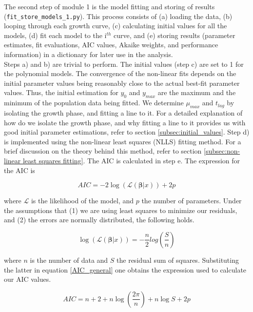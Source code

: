 \documentclass[titlepage,11pt]{article}
\begin{document}
\begin{linenumbers}
			The second step of module 1 is the model fitting and storing of results (\verb|fit_store_models_1.py|). This process consists of (a) loading the data, (b) looping through each growth curve, (c) calculating initial values for all the models, (d) fit each model to the i$ ^{th} $ curve, and (e) storing results (parameter estimates, fit evaluations, AIC values, Akaike weights, and performance information) in a dictionary for later use in the analysis. \\
			Steps a) and b) are trivial to perform. The initial values (step c) are set to 1 for the polynomial models. The convergence of the non-linear fits depends on the initial parameter values being reasonably close to the actual best-fit parameter values. Thus, the initial estimation for $ y_{0} $ and $ y_{max} $ are the maximum and the minimum of the population data being fitted. We determine $ \mu_{max} $ and $ t_{lag} $ by isolating the growth phase, and fitting a line to it. For a detailed explanation of how do we isolate the growth phase, and why fitting a line to it provides us with good initial parameter estimations, refer to section \ref{subsec:initial_values}. Step d) is implemented using the non-linear least squares (NLLS) fitting method. For a brief discussion on the theory behind this method, refer to section \ref{subsec:non-linear least squares fitting}. The AIC is calculated in step e. The expression for the AIC is
			\begin{linenomath*}
				\begin{equation}
				AIC = -2\log\left(\mathcal{L}(\boldsymbol{\beta}|x)\right) + 2p
				\label{AIC_general}
				\end{equation}
			\end{linenomath*}
			
			where $ \mathcal{L} $ is the likelihood of the model, and $ p $ the number of parameters. Under the assumptions that (1) we are using least squares to minimize our residuals, and (2) the errors are normally distributed, the following holds.
			\begin{linenomath*}
				\begin{equation}
				\log\left(\mathcal{L}(\boldsymbol{\beta}|x)\right) = -\frac{n}{2}log\left(\frac{S}{n}\right) 
				\end{equation}
			\end{linenomath*}
			
			where $ n $ is the number of data and $ S $ the residual sum of squares. Substituting the latter in equation \ref{AIC_general} one obtains the expression used to calculate our AIC values. \\
			\begin{linenomath*}
				\begin{equation}
				AIC = n + 2 + n \log\left(\frac{2\pi}{n}\right) + n\log S + 2 p
				\end{equation}
			\end{linenomath*}
			

\end{linenumbers}
\end{document}

